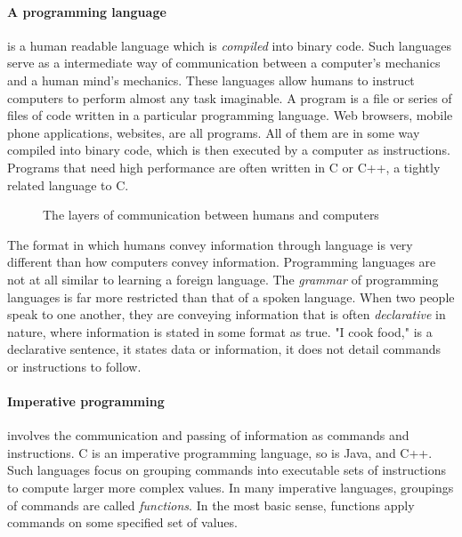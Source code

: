 \paragraph{ A programming language} is a human readable language which is \textit{compiled} into binary code. Such languages serve as a intermediate way of communication between a computer's mechanics and a human mind's mechanics. These languages allow humans to instruct computers to perform almost any task imaginable. A program is a file or series of files of code written in a particular programming language. Web browsers, mobile phone applications, websites, are all programs. All of them are in some way compiled into binary code, which is then executed by a computer as instructions. Programs that need high performance are often written in C or C++, a tightly related language to C.
\begin{figure}[h]
  \begin{center}
   \end{center}
\caption{The layers of communication between humans and computers}
\end{figure}

\par The format in which humans convey information through language is very different than how computers convey information. Programming languages are not at all similar to learning a foreign language. The \textit{grammar} of programming languages is far more restricted than that of a spoken language. When two people speak to one another, they are conveying information that is often \textit{declarative} in nature, where information is stated in some format as true. "I cook food," is a declarative sentence, it states data or information, it does not detail commands or instructions to follow.
\paragraph{Imperative programming} involves the communication and passing of information as commands and instructions. C is an imperative programming language, so is Java, and C++. Such languages focus on grouping commands into executable sets of instructions to compute larger more complex values. In many imperative languages, groupings of commands are called \textit{functions}. In the most basic sense, functions apply commands on some specified set of values.
